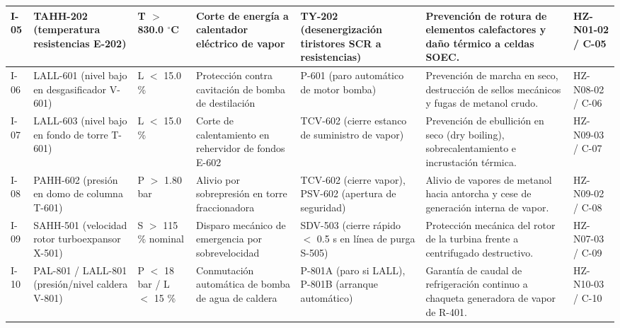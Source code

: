 \documentclass[10pt,letterpaper]{article}
\begin{document}
\begin{landscape}
\begin{xltabular}{\linewidth}{|l|p{2.6cm}|p{1.8cm}|p{2.8cm}|p{3.2cm}|>{\raggedright\arraybackslash}X|p{2.2cm}|}
I-05 & TAHH-202 (temperatura resistencias E-202) & T $>$ 830.0 $^\circ$C & Corte de energía a calentador eléctrico de vapor & TY-202 (desenergización tiristores SCR a resistencias) & Prevención de rotura de elementos calefactores y daño térmico a celdas SOEC. & HZ-N01-02 / C-05 \\ \hline
I-06 & LALL-601 (nivel bajo en desgasificador V-601) & L $<$ 15.0 \% & Protección contra cavitación de bomba de destilación & P-601 (paro automático de motor bomba) & Prevención de marcha en seco, destrucción de sellos mecánicos y fugas de metanol crudo. & HZ-N08-02 / C-06 \\ \hline
I-07 & LALL-603 (nivel bajo en fondo de torre T-601) & L $<$ 15.0 \% & Corte de calentamiento en rehervidor de fondos E-602 & TCV-602 (cierre estanco de suministro de vapor) & Prevención de ebullición en seco (dry boiling), sobrecalentamiento e incrustación térmica. & HZ-N09-03 / C-07 \\ \hline
I-08 & PAHH-602 (presión en domo de columna T-601) & P $>$ 1.80 bar & Alivio por sobrepresión en torre fraccionadora & TCV-602 (cierre vapor), PSV-602 (apertura de seguridad) & Alivio de vapores de metanol hacia antorcha y cese de generación interna de vapor. & HZ-N09-02 / C-08 \\ \hline
I-09 & SAHH-501 (velocidad rotor turboexpansor X-501) & S $>$ 115 \% nominal & Disparo mecánico de emergencia por sobrevelocidad & SDV-503 (cierre rápido $<$ 0.5 s en línea de purga S-505) & Protección mecánica del rotor de la turbina frente a centrifugado destructivo. & HZ-N07-03 / C-09 \\ \hline
I-10 & PAL-801 / LALL-801 (presión/nivel caldera V-801) & P $<$ 18 bar / L $<$ 15 \% & Conmutación automática de bomba de agua de caldera & P-801A (paro si LALL), P-801B (arranque automático) & Garantía de caudal de refrigeración continuo a chaqueta generadora de vapor de R-401. & HZ-N10-03 / C-10 \\ \hline
\end{xltabular}
\end{landscape}
\newpage
\end{document}
